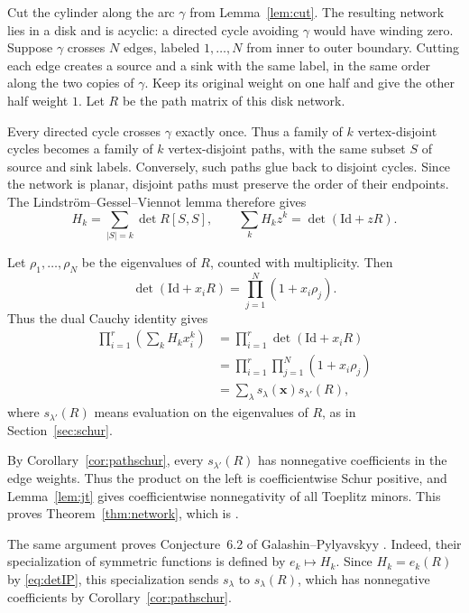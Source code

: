 \documentclass[11pt]{article}
\theoremstyle{definition}
\theoremstyle{remark}
\newcommand{\xx}{\mathbf x}
\begin{document}
Cut the cylinder along the arc $\gamma$ from
Lemma~\ref{lem:cut}. The resulting network lies
in a disk and is acyclic: a directed cycle
avoiding $\gamma$ would have winding zero.
Suppose $\gamma$ crosses $N$ edges, labeled
$1,\ldots,N$ from inner to outer boundary.
Cutting each edge creates a source and a sink
with the same label, in the same order along
the two copies of $\gamma$. Keep its original
weight on one half and give the other half
weight $1$. Let $R$ be the path matrix of
this disk network.

Every directed cycle crosses $\gamma$ exactly
once. Thus a family of $k$ vertex-disjoint
cycles becomes a family of $k$ vertex-disjoint
paths, with the same subset $S$ of source and
sink labels. Conversely, such paths glue back
to disjoint cycles. Since the network is planar,
disjoint paths must preserve the order of their
endpoints. The Lindstr\"om--Gessel--Viennot
lemma \cite{Lindstrom,GV} therefore gives
\begin{equation}\label{eq:detIP}
H_k=\sum_{|S|=k}\det R[S,S],
\qquad
\sum_k H_kz^k=\det(\mathrm{Id}+zR).
\end{equation}


Let $\rho_1,\ldots,\rho_N$ be the eigenvalues
of $R$, counted with multiplicity. Then
\[
\det(\mathrm{Id}+x_iR)
=\prod_{j=1}^N(1+x_i\rho_j).
\]
Thus the dual Cauchy identity gives
\[
\begin{aligned}
\prod_{i=1}^r\left(\sum_k H_kx_i^k\right)
&=\prod_{i=1}^r\det(\mathrm{Id}+x_iR)\\
&=\prod_{i=1}^r\prod_{j=1}^N(1+x_i\rho_j)\\
&=\sum_\lambda s_\lambda(\xx)s_{\lambda'}(R),
\end{aligned}
\]
where $s_{\lambda'}(R)$ means evaluation on
the eigenvalues of $R$, as in Section~\ref{sec:schur}.

By Corollary~\ref{cor:pathschur}, every
$s_{\lambda'}(R)$ has nonnegative coefficients
in the edge weights. Thus the product on the
left is coefficientwise Schur positive, and
Lemma~\ref{lem:jt} gives coefficientwise
nonnegativity of all Toeplitz minors.
This proves Theorem~\ref{thm:network}, which is
\cite[Conjecture~6.1]{GP}.


The same argument proves Conjecture~6.2 of
Galashin--Pylyavskyy \cite{GP}. Indeed, their
specialization of symmetric functions is defined
by $e_k\mapsto H_k$. Since $H_k=e_k(R)$ by
\eqref{eq:detIP}, this specialization sends
$s_\lambda$ to $s_\lambda(R)$, which has
nonnegative coefficients by
Corollary~\ref{cor:pathschur}.
\end{document}
